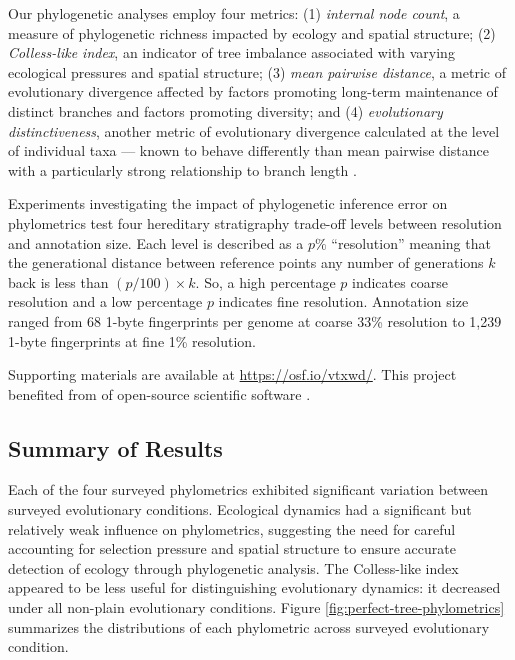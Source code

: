 Our phylogenetic analyses employ four metrics: (1) \textit{internal node count}, a measure of phylogenetic richness impacted by ecology and spatial structure; (2) \textit{Colless-like index}, an indicator of tree imbalance associated with varying ecological pressures and spatial structure; (3) \textit{mean pairwise distance}, a metric of evolutionary divergence affected by factors promoting long-term maintenance of distinct branches and factors promoting diversity; and (4) \textit{evolutionary distinctiveness}, another metric of evolutionary divergence calculated at the level of individual taxa --- known to behave differently than mean pairwise distance with a particularly strong relationship to branch length \citep{tuckerGuidePhylogeneticMetrics2017}.

Experiments investigating the impact of phylogenetic inference error on phylometrics test four hereditary stratigraphy trade-off levels between resolution and annotation size.
Each level is described as a $p\%$ ``resolution'' meaning that the generational distance between reference points any number of generations $k$ back is less than $(p / 100) \times k$.
So, a high percentage $p$ indicates coarse resolution and a low percentage $p$ indicates fine resolution.
Annotation size ranged from 68 1-byte fingerprints per genome at coarse 33\% resolution to 1,239 1-byte fingerprints at fine 1\% resolution.

Supporting materials are available at \url{https://osf.io/vtxwd/}.
This project benefited from of open-source scientific software \citep{ofria2020empirical,moreno2022hstrat,lalejini2019data,sukumaran2010dendropy}.

\vspace{-1.5ex}
\subsection{Summary of Results}

Each of the four surveyed phylometrics exhibited significant variation between surveyed evolutionary conditions.
Ecological dynamics had a significant but relatively weak influence on phylometrics, suggesting the need for careful accounting for selection pressure and spatial structure to ensure accurate detection of ecology through phylogenetic analysis.
The Colless-like index appeared to be less useful for distinguishing evolutionary dynamics: it decreased under all non-plain evolutionary conditions.
Figure \ref{fig:perfect-tree-phylometrics} summarizes the distributions of each phylometric across surveyed evolutionary condition.

